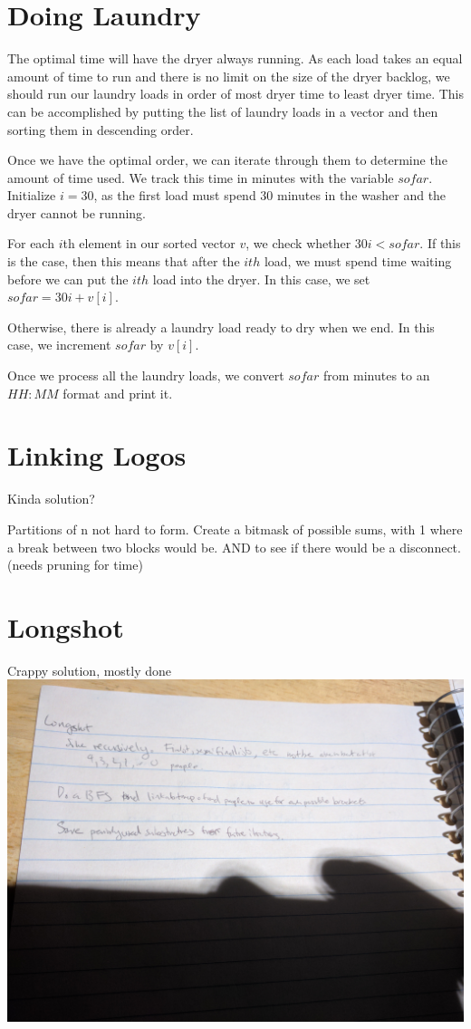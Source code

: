 \documentclass{article}
\begin{document}
\section{Doing Laundry}
The optimal time will have the dryer always running. As each load takes an equal amount of time to run and there is no limit on the size of the dryer backlog, we should run our laundry loads in order of most dryer time to least dryer time. This can be accomplished by putting the list of laundry loads in a vector and then sorting them in descending order. 
\par 
Once we have the optimal order, we can iterate through them to determine the amount of time used. We track this time in minutes with the variable $sofar$. Initialize $i=30$, as the first load must spend 30 minutes in the washer and the dryer cannot be running.
\par 
For each $i$th element in our sorted vector $v$, we check whether $30i<sofar$. If this is the case, then this means that after the $ith$ load, we must spend time waiting before we can put the $ith$ load into the dryer. In this case, we set $sofar=30i+v[i]$.
\par 
Otherwise, there is already a laundry load ready to dry when we end. In this case, we increment $sofar$ by $v[i]$.
\par 
Once we process all the laundry loads, we convert $sofar$ from minutes to an $HH:MM$ format and print it.

\section{Linking Logos}
Kinda solution?

Partitions of n not hard to form. Create a bitmask of possible sums, with 1 where a break between two blocks would be. AND to see if there would be a disconnect. (needs pruning for time)

\section{Longshot}
Crappy solution, mostly done
\includegraphics[width=.75\textwidth]{longshot}
\end{document}
